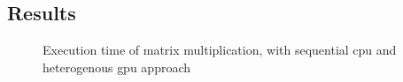 \subsection{Results} %
\label{sub:results}

\begin{figure}[h!]
    \centering
    
    \caption{Execution time of matrix multiplication, with sequential \gls{cpu} and heterogenous \gls{gpu} approach}\label{fig:test_results}
\end{figure}

